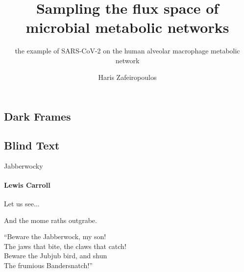 \documentclass{beamer}
\title{Sampling the flux space of microbial metabolic networks
} %
\subtitle{the example of SARS-CoV-2 on the human alveolar macrophage metabolic network} %
\author{Haris Zafeiropoulos}
\begin{document}
   \shorthandoff{-}
   \frame[c]{\maketitle}



   \begin{darkframes}

      \section{Dark Frames}
   
         \subsection{Blind Text}

            \begin{frame}{Jabberwocky}
               
               \framesubtitle{Lewis Carroll}%


               Let us see... 

               And the mome raths outgrabe.\\\bigskip

               “Beware the Jabberwock, my son!\\
               The jaws that bite, the claws that catch!\\
               Beware the Jubjub bird, and shun\\
               The frumious Bandersnatch!”\\
            \end{frame}

   \end{darkframes}
\end{document}

